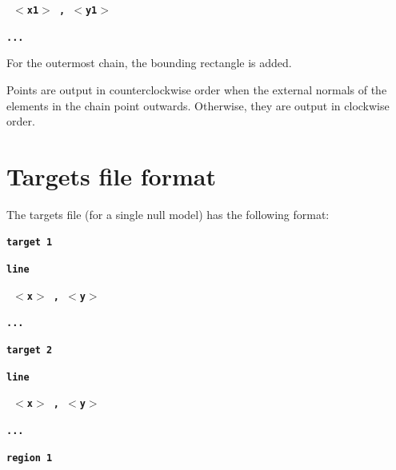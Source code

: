 \documentclass[12pt]{report}
\begin{document}
\textbf{\texttt{ \begin{math}<\end{math}x1\begin{math}>\end{math}  ,
 \begin{math}<\end{math}y1\begin{math}>\end{math} }}

\textbf{\texttt{...}}

For the outermost chain, the bounding rectangle is added.

Points are output in counterclockwise order when the external normals
of the elements in the chain point outwards. Otherwise, they are output
in clockwise order.

\section{Targets file format}

The targets file (for a single null model) has the following format:

\textbf{\texttt{target 1}}

\textbf{\texttt{line}}

\textbf{\texttt{ \begin{math}<\end{math}x\begin{math}>\end{math} ,
 \begin{math}<\end{math}y\begin{math}>\end{math}}}

\textbf{\texttt{...}}

\textbf{\texttt{target 2}}

\textbf{\texttt{line}}

\textbf{\texttt{ \begin{math}<\end{math}x\begin{math}>\end{math} ,
 \begin{math}<\end{math}y\begin{math}>\end{math}}}

\textbf{\texttt{...}}

\textbf{\texttt{region 1}}
\end{document}
